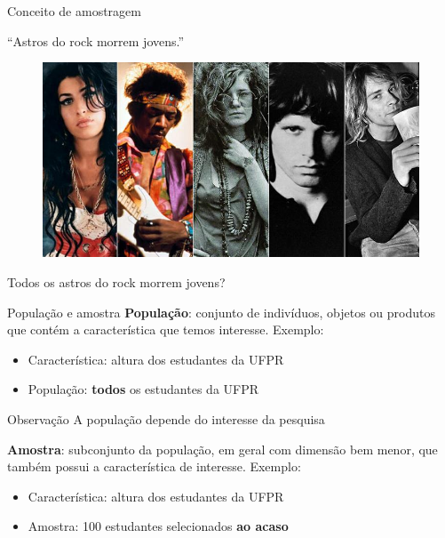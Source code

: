 \documentclass[10pt]{beamer}
\theoremstyle{definition}
\begin{document}
\begin{frame}{Conceito de amostragem}
  \begin{center}
    ``Astros do rock morrem jovens.''
  \end{center}
  \begin{figure}[h]
    \centering
    \includegraphics[width=.8\textwidth]{../img/rock}
  \end{figure}
  \begin{center}
    Todos os astros do rock morrem jovens?
  \end{center}
\end{frame}

\begin{frame}{População e amostra}
  \textbf{População}: conjunto de indivíduos, objetos ou produtos que
  contém a característica que temos interesse. Exemplo:
  \begin{itemize}
  \item Característica: altura dos estudantes da UFPR
  \item População: \textbf{todos} os estudantes da UFPR
  \end{itemize}
  \begin{alertblock}{Observação}
    A população depende do interesse da pesquisa
  \end{alertblock}
  \vspace{1em}
  \textbf{Amostra}: subconjunto da população, em geral com dimensão bem
  menor, que também possui a característica de interesse. Exemplo:
  \begin{itemize}
  \item Característica: altura dos estudantes da UFPR
  \item Amostra: 100 estudantes selecionados \textbf{ao acaso}
  \end{itemize}
\end{frame}
\end{document}
